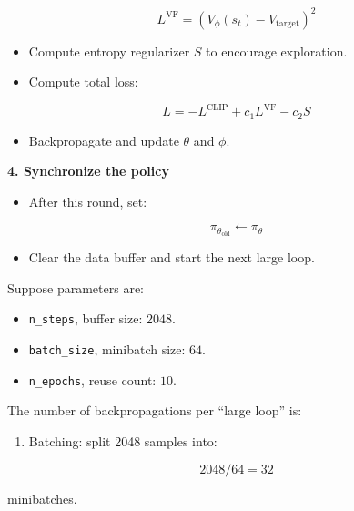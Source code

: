\[
L^{\mathrm{VF}}=\left(V_\phi(s_t)-V_{\mathrm{target}}\right)^{2}
\]

\begin{itemize}
\tightlist
\item
  Compute entropy regularizer \(S\) to encourage exploration.
\item
{}
  Compute total loss:
\end{itemize}

\[
L=-L^{\mathrm{CLIP}}+c_1L^{\mathrm{VF}}-c_2S
\]

\begin{itemize}
\tightlist
\item
  Backpropagate and update \(\theta\) and \(\phi\).
\end{itemize}

\textbf{4. Synchronize the policy}

\begin{itemize}
\tightlist
\item
{}
  After this round, set:
\end{itemize}

\[
\pi_{\theta_{\mathrm{old}}}\leftarrow\pi_\theta
\]

\begin{itemize}
\tightlist
\item
  Clear the data buffer and start the next large loop.
\end{itemize}

Suppose parameters are:

\begin{itemize}
\tightlist
\item
  \texttt{n\_steps}, buffer size: \(2048\).
\item
  \texttt{batch\_size}, minibatch size: \(64\).
\item
  \texttt{n\_epochs}, reuse count: \(10\).
\end{itemize}

The number of backpropagations per ``large loop'' is:

\begin{enumerate}
\def\labelenumi{\arabic{enumi}.}
\tightlist
\item
{}
  Batching: split 2048 samples into:
\end{enumerate}

\[
2048/64=32
\]

minibatches.

